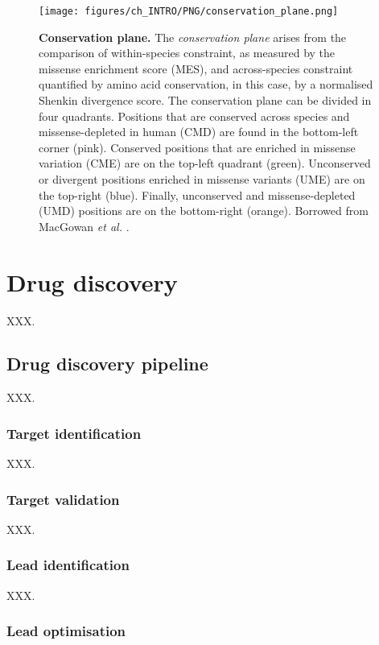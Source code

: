 \begin{figure}[htb!]
    \centering
    \texttt{[image: figures/ch\_INTRO/PNG/conservation\_plane.png]}
    \caption[Conservation plane]{\textbf{Conservation plane.} The \textit{conservation plane} arises from the comparison of within-species constraint, as measured by the missense enrichment score (MES), and across-species constraint quantified by amino acid conservation, in this case, by a normalised Shenkin divergence score. The conservation plane can be divided in four quadrants. Positions that are conserved across species and missense-depleted in human (CMD) are found in the bottom-left corner (pink). Conserved positions that are enriched in missense variation (CME) are on the top-left quadrant (green). Unconserved or divergent positions enriched in missense variants (UME) are on the top-right (blue). Finally, unconserved and missense-depleted (UMD) positions are on the bottom-right (orange). Borrowed from MacGowan \textit{et al.} \cite{MACGOWAN_2024_VARIANTS}.}
    \label{fig:conservation_plane}
\end{figure}

\section{Drug discovery}

XXX.

\subsection{Drug discovery pipeline}

XXX.

\subsubsection{Target identification}

XXX.

\subsubsection{Target validation}

XXX.

\subsubsection{Lead identification}

XXX.

\subsubsection{Lead optimisation}

